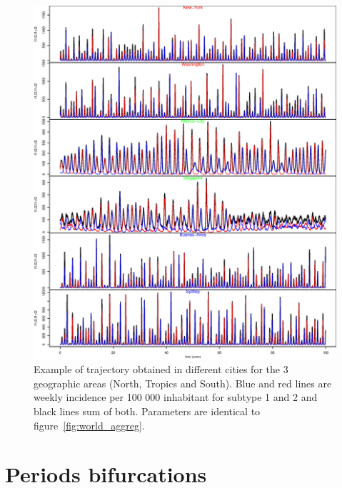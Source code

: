 \documentclass[12pt]{article}
\begin{document}
\begin{figure}[htb]
  \center
  \includegraphics[width= 0.8 \linewidth]{graph_annexe/traj_upca_metapop.eps}
  \caption{Example of trajectory obtained in different cities for the
    3 geographic areas (North, Tropics and South). Blue and red lines
    are weekly incidence per 100 000 inhabitant for subtype 1 and 2
    and black lines sum of both. Parameters are identical to
    figure~\ref{fig:world_aggreg}.}
  \label{fig:traj_upca_metapop}
\end{figure}


\clearpage

\section{Periods bifurcations}
\end{document}
